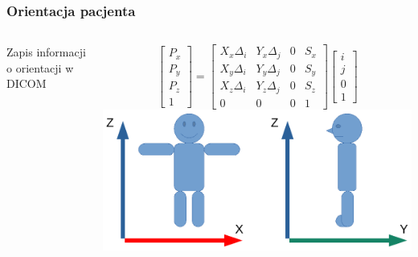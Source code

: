 \documentclass[aspectratio=169]{beamer}
\begin{document}
\begin{frame}[t]
    \frametitle{Orientacja pacjenta}
    \begin{columns}[t]

        Zapis informacji o orientacji w DICOM
        \tiny
        \vspace{1em}
        \begin{columns}
            \vspace{-2em}
            \[
                \begin{bmatrix}
                    P_x \\ P_y \\ P_z \\ 1
                \end{bmatrix}
                =
                \begin{bmatrix}
                    X_x\Delta_i & Y_x\Delta_j & 0 & S_x \\
                    X_y\Delta_i & Y_y\Delta_j & 0 & S_y \\
                    X_z\Delta_i & Y_z\Delta_j & 0 & S_z \\
                    0           & 0           & 0 & 1
                \end{bmatrix}
                \begin{bmatrix}
                    i \\ j \\ 0 \\ 1
                \end{bmatrix}
            \]
            \includegraphics[width=\textwidth]{img/imageorientationindicator-003.pdf}
        \end{columns}


\end{columns}
\end{frame}
\end{document}
